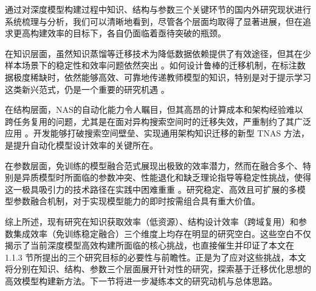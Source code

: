 \documentclass[../main.tex]{subfiles}
\begin{document}
\label{sec:ch1-2-4-summary-and-opportunities}

通过对深度模型构建过程中知识、结构与参数三个关键环节的国内外研究现状进行系统梳理与分析，我们可以清晰地看到，尽管各个层面均取得了显著进展，但在追求更高构建效率的目标下，各自仍面临着亟待突破的瓶颈。

在知识层面，虽然知识蒸馏等迁移技术为降低数据依赖提供了有效途径，但其在少样本场景下的稳定性和效率问题依然突出 。如何设计鲁棒的迁移机制，在标注数据极度稀缺时，依然能够高效、可靠地传递教师模型的知识，特别是对于提示学习这类新兴范式，仍是一个重要的研究机遇 。

在结构层面，NAS的自动化能力令人瞩目，但其高昂的计算成本和架构经验难以跨任务复用的问题，尤其是在面对异构搜索空间时的迁移失效，严重制约了其广泛应用 。开发能够打破搜索空间壁垒、实现通用架构知识迁移的新型 TNAS 方法，是提升自动化模型设计效率的关键所在。

在参数层面，免训练的模型融合范式展现出极致的效率潜力，然而在融合多个、特别是异质模型时所面临的参数冲突、性能退化和缺乏理论指导等稳定性挑战，使得这一极具吸引力的技术路径在实践中困难重重 。研究稳定、高效且可扩展的多模型参数融合机制，对于实现模型能力的即时按需组合具有重大价值。

综上所述，现有研究在知识获取效率（低资源）、结构设计效率（跨域复用）和参数集成效率（免训练稳定融合）三个维度上均存在明显的研究空白。这些空白不仅揭示了当前深度模型高效构建所面临的核心挑战，也直接催生并印证了本文在 1.1.3 节所提出的三个研究目标的必要性与前瞻性。正是为了应对这些挑战，本文将分别在知识、结构、参数三个层面展开针对性的研究，探索基于迁移优化思想的高效模型构建新方法。下一节将进一步凝练本文的研究动机与总体思路。
\end{document}
